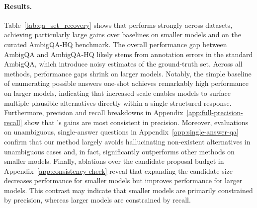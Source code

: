 \paragraph{Results.}
Table~\ref{tab:qa_set_recovery} shows that \circleclar{} performs strongly across datasets, achieving particularly large gains over baselines on smaller models and on the curated AmbigQA-HQ benchmark. The overall performance gap between AmbigQA and AmbigQA-HQ likely stems from annotation errors in the standard AmbigQA, which introduce noisy estimates of the ground-truth set. Across all methods, performance gaps shrink on larger models. Notably, the simple baseline of enumerating possible answers one-shot achieves remarkably high performance on larger models, indicating that increased scale enables models to surface multiple plausible alternatives directly within a single structured response. Furthermore, precision and recall breakdowns in Appendix~\ref{app:full-precision-recall} show that \circleclar{}'s gains are most consistent in precision. Moreover, evaluations on unambiguous, single-answer questions in Appendix~\ref{app:single-answer-qa} confirm that our method largely avoids hallucinating non-existent alternatives in unambiguous cases and, in fact, significantly outperforms other methods on smaller models. Finally, ablations over the candidate proposal budget in Appendix~\ref{app:consistency-check} reveal that expanding the candidate size decreases performance for smaller models but improves performance for larger models. This contrast may indicate that smaller models are primarily constrained by precision, whereas larger models are constrained by recall.




